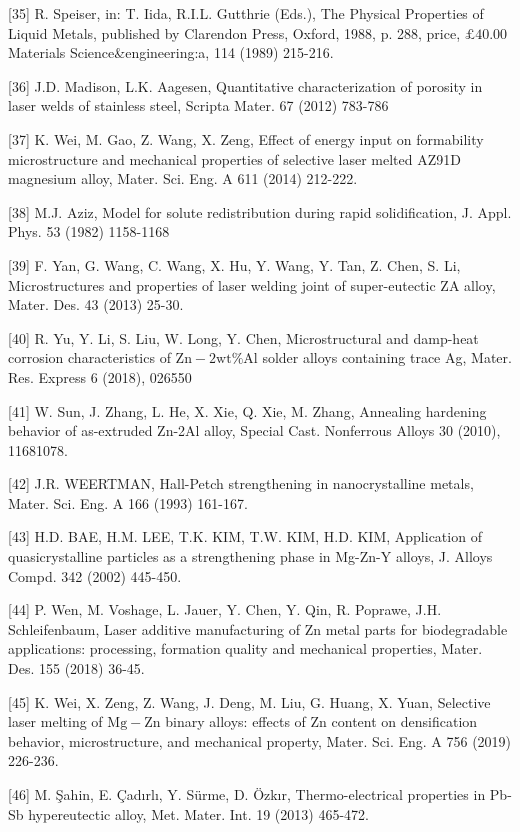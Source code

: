 \documentclass[10pt]{article}
\begin{document}
[35] R. Speiser, in: T. Iida, R.I.L. Gutthrie (Eds.), The Physical Properties of Liquid Metals, published by Clarendon Press, Oxford, 1988, p. 288, price, $\pounds 40.00$ Materials Science\&engineering:a, 114 (1989) 215-216.

[36] J.D. Madison, L.K. Aagesen, Quantitative characterization of porosity in laser welds of stainless steel, Scripta Mater. 67 (2012) 783-786

[37] K. Wei, M. Gao, Z. Wang, X. Zeng, Effect of energy input on formability microstructure and mechanical properties of selective laser melted AZ91D magnesium alloy, Mater. Sci. Eng. A 611 (2014) 212-222.

[38] M.J. Aziz, Model for solute redistribution during rapid solidification, J. Appl. Phys. 53 (1982) 1158-1168

[39] F. Yan, G. Wang, C. Wang, X. Hu, Y. Wang, Y. Tan, Z. Chen, S. Li, Microstructures and properties of laser welding joint of super-eutectic ZA alloy, Mater. Des. 43 (2013) 25-30.

[40] R. Yu, Y. Li, S. Liu, W. Long, Y. Chen, Microstructural and damp-heat corrosion characteristics of $\mathrm{Zn}-2 \mathrm{wt} \% \mathrm{Al}$ solder alloys containing trace Ag, Mater. Res. Express 6 (2018), 026550

[41] W. Sun, J. Zhang, L. He, X. Xie, Q. Xie, M. Zhang, Annealing hardening behavior of as-extruded Zn-2Al alloy, Special Cast. Nonferrous Alloys 30 (2010), 11681078.

[42] J.R. WEERTMAN, Hall-Petch strengthening in nanocrystalline metals, Mater. Sci. Eng. A 166 (1993) 161-167.

[43] H.D. BAE, H.M. LEE, T.K. KIM, T.W. KIM, H.D. KIM, Application of quasicrystalline particles as a strengthening phase in Mg-Zn-Y alloys, J. Alloys Compd. 342 (2002) 445-450.

[44] P. Wen, M. Voshage, L. Jauer, Y. Chen, Y. Qin, R. Poprawe, J.H. Schleifenbaum, Laser additive manufacturing of $\mathrm{Zn}$ metal parts for biodegradable applications: processing, formation quality and mechanical properties, Mater. Des. 155 (2018) 36-45.

[45] K. Wei, X. Zeng, Z. Wang, J. Deng, M. Liu, G. Huang, X. Yuan, Selective laser melting of $\mathrm{Mg}-\mathrm{Zn}$ binary alloys: effects of $\mathrm{Zn}$ content on densification behavior, microstructure, and mechanical property, Mater. Sci. Eng. A 756 (2019) 226-236.

[46] M. Şahin, E. Çadırlı, Y. Sürme, D. Özkır, Thermo-electrical properties in Pb-Sb hypereutectic alloy, Met. Mater. Int. 19 (2013) 465-472.
\end{document}
